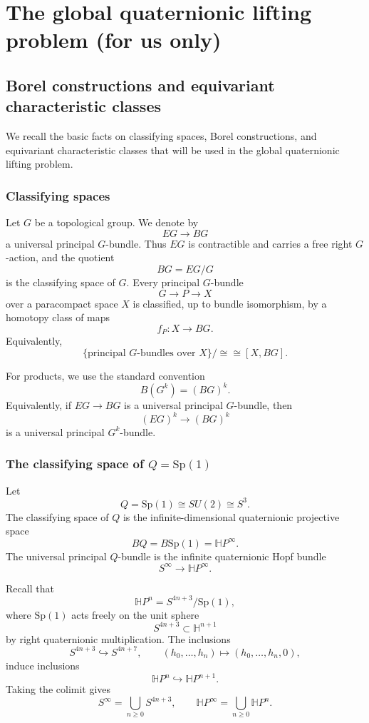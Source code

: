 \documentclass[11pt,a4paper]{article}
\numberwithin{equation}{section}
\theoremstyle{named}
\begin{document}
\iffalse
\section{The global quaternionic lifting problem (for us only)}

\subsection{Borel constructions and equivariant characteristic classes}
\label{sec:borel}

We recall the basic facts on classifying spaces, Borel constructions, and equivariant characteristic classes that will be used in the global quaternionic lifting problem.

\subsubsection{Classifying spaces}

Let \(G\) be a topological group. We denote by
\[
EG\longrightarrow BG
\]
a universal principal \(G\)-bundle. Thus \(EG\) is contractible and carries a free right \(G\)-action, and the quotient
\[
BG=EG/G
\]
is the classifying space of \(G\). Every principal \(G\)-bundle
\[
G\longrightarrow P\longrightarrow X
\]
over a paracompact space \(X\) is classified, up to bundle isomorphism, by a homotopy class of maps
\[
f_P:X\longrightarrow BG.
\]
Equivalently,
\[
\{ \text{principal }G\text{-bundles over }X\}/\cong
\cong
[X,BG].
\]

For products, we use the standard convention
\[
B(G^k)=(BG)^k.
\]
Equivalently, if \(EG\to BG\) is a universal principal \(G\)-bundle, then
\[
(EG)^k\longrightarrow (BG)^k
\]
is a universal principal \(G^k\)-bundle.

\subsubsection{The classifying space of \(Q=\text{Sp}(1)\)}

Let
\[
Q=\text{Sp}(1)\cong SU(2)\cong S^3.
\]
The classifying space of \(Q\) is the infinite-dimensional quaternionic projective space
\[
BQ=B\text{Sp}(1)=\mathbb HP^\infty.
\]
The universal principal \(Q\)-bundle is the infinite quaternionic Hopf bundle
\[
S^\infty\longrightarrow \mathbb HP^\infty.
\]

Recall that
\[
\mathbb HP^n=S^{4n+3}/\text{Sp}(1),
\]
where \(\text{Sp}(1)\) acts freely on the unit sphere
\[
S^{4n+3}\subset \mathbb H^{n+1}
\]
by right quaternionic multiplication. The inclusions
\[
S^{4n+3}\hookrightarrow S^{4n+7},
\qquad
(h_0,\ldots,h_n)\mapsto(h_0,\ldots,h_n,0),
\]
induce inclusions
\[
\mathbb HP^n\hookrightarrow \mathbb HP^{n+1}.
\]
Taking the colimit gives
\[
S^\infty=\bigcup_{n\geq 0}S^{4n+3},
\qquad
\mathbb HP^\infty=\bigcup_{n\geq 0}\mathbb HP^n.
\]
\end{document}
